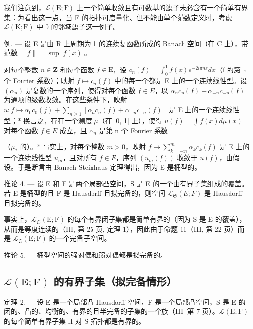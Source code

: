 我们注意到，\(\mathcal{L}(\mathrm{E};\mathrm{F})\) 上一个简单收敛且有可数基的滤子未必含有一个简单有界集：为看出这一点，当 F 的拓扑可度量化、但不能由单个范数定义时，考虑 \(\mathcal{L}(\mathrm{K};\mathrm{F})\) 中 0 的邻域滤子这一例子。

例. --- 设 E 是由 R 上周期为 1 的连续复函数所成的 Banach 空间（在 C 上），带范数 \(\|f\| = \sup |f(x)|\)。

对每个整数 \(n \in \mathbf{Z}\) 和每个函数 \(f \in \mathrm{E}\)，设 \(c_{n}(f) = \int_{0}^{1} f(x)e^{-2i\pi nx} dx\)（f 的第 n 个 Fourier 系数）；映射 \(f \mapsto c_{n}(f)\) 中的每一个都是 E 上的一个连续线性型。设 \((\alpha_{n})\) 是复数的一个序列，使得对每个函数 \(f \in E\)，以 \(\alpha_{n}c_{n}(f) + \alpha_{-n}c_{-n}(f)\) 为通项的级数收敛。在这些条件下，映射 \(u: f \mapsto \alpha_{0}c_{0}(f) + \sum_{n \geqslant 1} [\alpha_{n}c_{n}(f) + \alpha_{-n}c_{-n}(f)]\) 是 E 上的一个连续线性型；* 换言之，存在一个测度 \(\mu\)（在 {[}0, 1{]} 上），使得 \(u(f) = \int f(x) d\mu(x)\) 对每个函数 \(f \in E\) 成立，且 \(\alpha_{n}\) 是第 n 个 Fourier 系数

（\(\mu_{*}\) 的）。* 事实上，对每个整数 \(m > 0\)，映射 \(f \mapsto \sum_{k = -m}^{m} \alpha_k c_k(f)\) 是 E 上的一个连续线性型 \(u_{m}\)，且对所有 \(f \in E\)，序列 \((u_{m}(f))\) 收敛于 \(u(f)\)，由假设。于是断言由 Banach-Steinhaus 定理得出，因为 E 是桶型的。

推论 4. --- 设 E 和 F 是两个局部凸空间，S 是 E 的一个由有界子集组成的覆盖。若 E 是桶型的且 F 是 Hausdorff 且拟完备的，则空间 \(\mathcal{L}_{\mathfrak{S}}(E;F)\) 是 Hausdorff 且拟完备的。

事实上，\(\mathcal{L}_{\mathfrak{S}}(\mathrm{E};\mathrm{F})\) 的每个有界闭子集都是简单有界的（因为 S 是 E 的覆盖），从而是等度连续的（III, 第 25 页, 定理 1），因此由于命题 11（III, 第 22 页）而是 \(\mathcal{L}_{\mathfrak{S}}(\mathrm{E};\mathrm{F})\) 的一个完备子空间。

推论 5. --- 桶型空间的强对偶和弱对偶都是拟完备的。

\subsection{\texorpdfstring{\(\mathcal{L}(\mathbf{E};\mathbf{F})\) 的有界子集（拟完备情形）}{\textbackslash mathcal\{L\}(\textbackslash mathbf\{E\};\textbackslash mathbf\{F\}) 的有界子集（拟完备情形）}}

定理 2. --- 设 E 是一个局部凸 Hausdorff 空间，F 是一个局部凸空间，S 是 E 的闭的、凸的、均衡的、有界的且半完备的子集的一个族（III, 第 7 页）。\(\mathcal{L}(\mathrm{E};\mathrm{F})\) 的每个简单有界子集 H 对 S-拓扑都是有界的。

